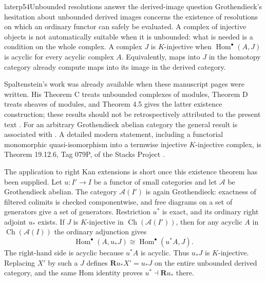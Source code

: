 \begin{dcomment}{later}{p54}{Unbounded resolutions answer the derived-image question}
Grothendieck's hesitation about unbounded derived images concerns the existence of resolutions on which an ordinary functor can safely be evaluated. A complex of injective objects is not automatically suitable when it is unbounded: what is needed is a condition on the whole complex. A complex $J$ is $K$-injective when $\operatorname{Hom}^\bullet(A,J)$ is acyclic for every acyclic complex $A$. Equivalently, maps into $J$ in the homotopy category already compute maps into its image in the derived category.

Spaltenstein's work was already available when these manuscript pages were written. His Theorem C treats unbounded complexes of modules, Theorem D treats sheaves of modules, and Theorem 4.5 gives the latter existence construction; these results should not be retrospectively attributed to the present text \citep{Spaltenstein1988}. For an arbitrary Grothendieck abelian category the general result is associated with \citet{Serpe2003}. A detailed modern statement, including a functorial monomorphic quasi-isomorphism into a termwise injective $K$-injective complex, is Theorem 19.12.6, Tag 079P, of the Stacks Project \citep{StacksKInjective079P}.

The application to right Kan extensions is short once this existence theorem has been supplied. Let $u:I'\to I$ be a functor of small categories and let $\mathcal A$ be Grothendieck abelian. The category $\mathcal A(I')$ is again Grothendieck: exactness of filtered colimits is checked componentwise, and free diagrams on a set of generators give a set of generators. Restriction $u^*$ is exact, and its ordinary right adjoint $u_*$ exists. If $J$ is $K$-injective in $\operatorname{Ch}(\mathcal A(I'))$, then for any acyclic $A$ in $\operatorname{Ch}(\mathcal A(I))$ the ordinary adjunction gives
\[
 \operatorname{Hom}^\bullet(A,u_*J)
   \cong\operatorname{Hom}^\bullet(u^*A,J).
\]
The right-hand side is acyclic because $u^*A$ is acyclic. Thus $u_*J$ is $K$-injective. Replacing $X'$ by such a $J$ defines $\mathbf Ru_*X'=u_*J$ on the entire unbounded derived category, and the same Hom identity proves $u^*\dashv\mathbf Ru_*$ there.


\end{dcomment}

